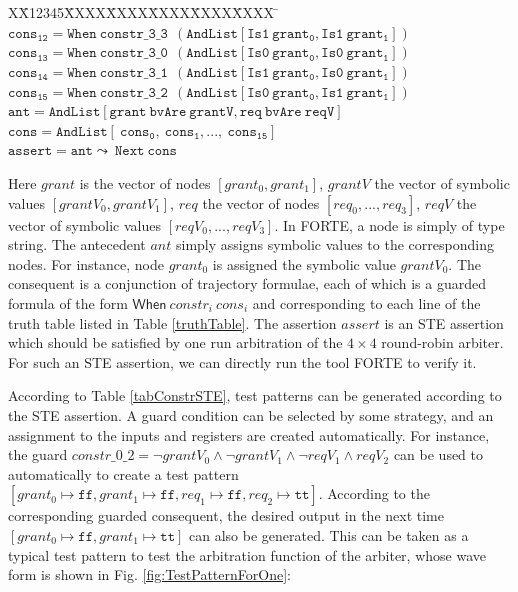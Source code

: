 \documentclass[final]{IEEEtran}
\newlength{\fminilength}
\newenvironment{fmini}[1][\linewidth]
  {\setlength{\fminilength}{#1\fboxsep-2\fboxrule}%
   \vspace{2ex}\noindent\begin{lrbox}{\fminibox}\begin{minipage}{\fminilength}%
   \mbox{ }\hfill\vspace{-2.5ex}}%
  {\end{minipage}\end{lrbox}\vspace{1ex}\hspace{0ex}%
   \framebox{\usebox{\fminibox}}}
\newenvironment{specification}
{\noindent\footnotesize\tt\begin{fmini}\begin{tabbing}X\=X12345\=XXXX\=XXXX\=XXXX\=XXXX\=XXXX
\=\+\kill} {\end{tabbing}\normalfont\end{fmini}}
\begin{document}
\begin{center}
\begin{table}
\begin{specification}
$\mathtt{cons_{12}=When\ constr\_3\_3\   \ ( AndList [Is1\  grant_0,Is1\  grant_1])}$\\

$\mathtt{cons_{13}=When\ constr\_3\_0\   \ (AndList [Is0\
grant_0,Is0\
grant_1])}$\\

$\mathtt{cons_{14}=When\ constr\_3\_1\   \ ( AndList
[Is1\  grant_0,Is0\  grant_1])}$\\

$\mathtt{cons_{15}=When\ constr\_3\_2\
   \ (AndList [Is0\  grant_0,Is1\  grant_1])}$\\

$\mathtt{ant=AndList [grant\ bvAre\ grantV,req\ bvAre\ reqV]}$\\

$\mathtt{cons= AndList [ \ cons_0,  \ cons_1,..., \ cons_{15}]}$\\

$\mathtt{assert=ant \leadsto \ Next\ cons}$\\



\end{specification}
\end{table}
\end{center}


Here   $grant$ is the vector of nodes  $[grant_0,grant_1]$, $grantV$
the vector of symbolic values $[grantV_0,grantV_1]$, $req$ the vector
of nodes  $[req_0,...,req_3]$, $reqV$ the vector of symbolic values
$[reqV_0,...,reqV_3]$. In FORTE, a node is simply of type string.
The antecedent $ant$ simply assigns symbolic values to the
corresponding nodes. For instance, node $grant_0$ is assigned the
symbolic value $grantV_0$. The consequent is a conjunction of
trajectory formulae, each of which is a guarded formula of the form
$\mathsf{When} \ constr_i \ cons_i$ and corresponding to each line
of the truth table listed in Table \ref{truthTable}. The assertion
$assert$ is an STE assertion which should be satisfied by one run
arbitration of the $4 \times 4$ round-robin
 arbiter. For such an STE assertion, we can directly run the tool
 FORTE to verify it.

 According to Table \ref{tabConstrSTE}, test patterns can be
 generated according to the STE assertion. A
 guard condition can be selected by some strategy, and an assignment
  to the inputs and registers are created automatically. For
  instance,  the guard  $constr\_0\_2 =   \neg grantV_0\wedge \neg
  grantV_1\wedge \neg reqV_1 \wedge reqV_2$ can be used to automatically
to create a test pattern $[grant_0 \mapsto \mathtt{ff},
grant_1\mapsto \mathtt{ff}, req_1\mapsto \mathtt{ff}, req_2\mapsto
\mathtt{tt}]$. According to the corresponding guarded consequent,
the desired output in the next time $[ grant_0 \mapsto \mathtt{ff} ,
grant_1 \mapsto \mathtt{tt}]$ can also be generated. This can be
taken as a typical test pattern to test the arbitration function of
the arbiter, whose wave form is shown in Fig.
\ref{fig:TestPatternForOne}:
\end{document}
